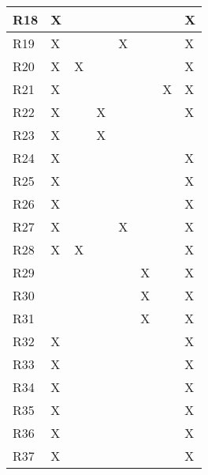\begin{table}[]
\begin{tabular}{|l|l|l|l|l|l|l|l|}
    R18 & X  &    &    &    &     &    & X    \\ \hline
    R19 & X  &    &    & X  &     &    & X    \\ \hline
    R20 & X  & X  &    &    &     &    & X    \\ \hline
    R21 & X  &    &    &    &     & X  & X    \\ \hline
    R22 & X  &    & X  &    &     &    & X    \\ \hline
    R23 & X  &    & X  &    &     &    &      \\ \hline
    R24 & X  &    &    &    &     &    & X    \\ \hline
    R25 & X  &    &    &    &     &    & X    \\ \hline
    R26 & X  &    &    &    &     &    & X    \\ \hline
    R27 & X  &    &    & X  &     &    & X    \\ \hline
    R28 & X  & X  &    &    &     &    & X    \\ \hline
    R29 &    &    &    &    & X   &    & X    \\ \hline
    R30 &    &    &    &    & X   &    & X    \\ \hline
    R31 &    &    &    &    & X   &    & X    \\ \hline
    R32 & X  &    &    &    &     &    & X    \\ \hline
    R33 & X  &    &    &    &     &    & X    \\ \hline
    R34 & X  &    &    &    &     &    & X    \\ \hline
    R35 & X  &    &    &    &     &    & X    \\ \hline
    R36 & X  &    &    &    &     &    & X    \\ \hline
    R37 & X  &    &    &    &     &    & X    \\ \hline
    \end{tabular}
    \end{table}